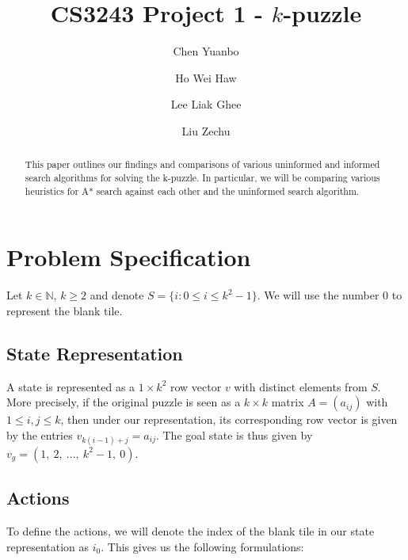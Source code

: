 \documentclass[runningheads]{llncs}
\begin{document}
%
\title{CS3243 Project 1 - $k$-puzzle}
%
%
\author{Chen Yuanbo \and
Ho Wei Haw \and
Lee Liak Ghee \and
Liu Zechu}
%
%
%
\maketitle              %
%
\begin{abstract}
This paper outlines our findings and comparisons of various uninformed and informed search algorithms for solving the k-puzzle. In particular, we will be comparing various heuristics for A* search against each other and the uninformed search algorithm. 
\end{abstract}
%
%
%
\section{Problem Specification}
Let $k \in \mathbb{N}$, $k \geq 2$ and denote $ S = \{ i : 0 \leq i \leq k^2 - 1 \}$. We will use the number $0$ to represent the blank tile.

\subsection{State Representation}
A state is represented as a $1 \times k^{2}$ row vector $v$ with distinct elements from $S$. More precisely, if the original puzzle is seen as a $k \times k$ matrix $A = \left( a_{ij} \right)$ with $1 \leq i,j \leq k$, then under our representation, its corresponding row vector is given by the entries $ v_{k(i - 1) + j} = a_{ij} $. The goal state is thus given by $v_g = \left( 1, \ 2,\ ..., \ k^2 - 1, \ 0 \right)$.

\subsection{Actions}
To define the actions, we will denote the index of the blank tile in our state representation as $i_0$. This gives us the following formulations:
\end{document}
